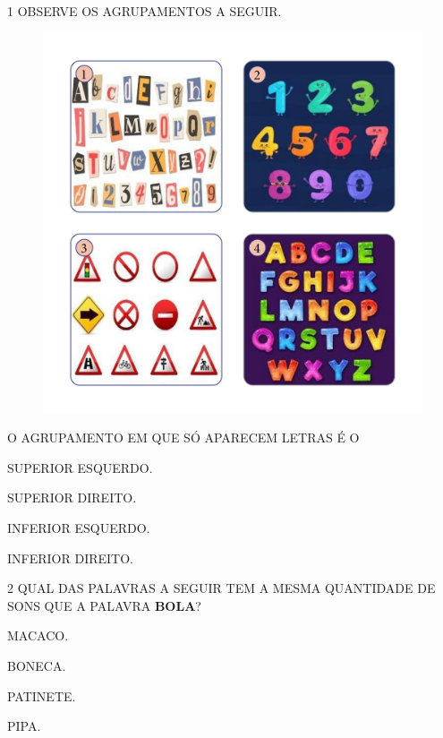 
\num{1} OBSERVE OS AGRUPAMENTOS A SEGUIR.

\begin{figure}[H]
\includegraphics[width=\textwidth]{media/image183a186}
\end{figure}

O AGRUPAMENTO EM QUE SÓ APARECEM LETRAS É O

\begin{escolha}
\item SUPERIOR ESQUERDO.

\item SUPERIOR DIREITO.

\item INFERIOR ESQUERDO.

\item INFERIOR DIREITO.
\end{escolha}

\pagebreak

\num{2} QUAL DAS PALAVRAS A SEGUIR TEM A MESMA QUANTIDADE DE SONS QUE A PALAVRA \textbf{BOLA}?

\begin{escolha}[itemsep=-5pt]
\item MACACO.

\item BONECA.

\item PATINETE.

\item PIPA.
\end{escolha}

